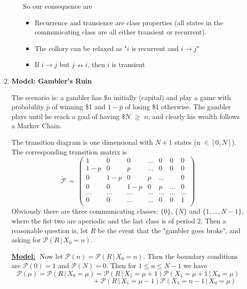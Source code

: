 \documentclass[10.5pt]{article}
\newcommand{\transmtx}[0]{\utilde{\mathcal{P}}}
\newcommand{\prob}[0]{\mathcal{P}}
\newcommand{\hilight}[1]{\colorbox{orange!20}{#1}}
\newenvironment{changemargin}[2]{%
  \begin{list}{}{%
    \setlength{\topsep}{0pt}%
    \setlength{\leftmargin}{#1}%
    \setlength{\rightmargin}{#2}%
    \setlength{\listparindent}{\parindent}%
    \setlength{\itemindent}{\parindent}%
    \setlength{\parsep}{\parskip}%
  }%
  \item[]}{\end{list}}
\begin{document}
\begin{changemargin}{-0.125in}{0in}
\begin{enumerate}
\begin{enumerate}
       So our consequence are 
       
       \begin{itemize}
       	\item Recurrence and transience are \hilight{class properties} (all states in the communicating class are all either transient or recurrent).
        
        \item The collory can be relaxed as "$i$ is recurrent and $i \rightarrow j$"
        \item If $i \rightarrow j$ but $j \nrightarrow i$, then $i$ is transient
        \end{itemize}
      \end{enumerate}
      
      
      \medskip
    
    \item \textbf{Model: Gambler's Ruin}
    
    \medskip
    
    The scenario is: a gambler has \$$n$ initially (capital) and play a game with probability $\bar{p}$ of winning \$1 and $1 - \bar{p}$ of losing \$1 otherwise. The gambler plays until he reach a goal of having \$$N$ $\geq$ $n$, and clearly his wealth follows a Markov Chain. 
    
    
    \medskip
    
    The transition diagram is one dimensional with $N + 1$ states (n $\in [0,N]$). The corresponding transition matrix is 
    \[
    \transmtx \, = \,
    \left(\begin{array}{ccccccc}
      1 & 0 &0 & ... & 0 & 0 & 0\\ 
      1-p & 0 & p & ... & 0 & 0 & 0\\
      0 & 1-p & 0 & p & ... & & 0\\
      0  & 0 &1-p & 0 & p & ... & 0\\  
      ... & ... &... &... &... &... & ...\\ 
      0 & 0 &... &... &0 &0 & 1\\    
      \end{array}\right)
    \]
    Obviously there are three communicating classes: $\{0\}$, $\{N\}$ and $\{1, ..., N-1\}$, where the fist two are aperiodic and the last class is of period 2. Then a reasonable question is, let $R$ be the event that the "gambler goes broke", and asking for $\prob(R \,|\, X_0 = n)$. 
    
    \medskip
    
    \underline{\textbf{Model:}}\,\, Now let $\prob(n) = \prob(R \,|\, X_0 = n)$. Then the boundary conditions are $\prob(0) = 1$ and $\prob(N) = 0$. Then for $1 \leq n \leq  N-1$ we have 
    \[
    \prob(\mu) = \prob(R \,|\, X_0 = \mu) = \prob(R\,|\,X_1 = \mu+1)\prob(X_1 = \mu+1\,|\,X_0 = \mu) 
    \]
    \[
    \,\,\,\,\,\,\,\,\,\,\,\,\,\,\,\, \,\,\,\,\,\,\,\,\,\,\,\,\,\,\,\, \,\,\,\,\,\,\,\,\,\,\,\,\,\,\,\, \,\,\,\,\,\,\,\,\,\,\,\,\,\,\,\,+ \prob(R\,|\,X_1 = \mu -1)\prob(X_1 = n-1\,|\,X_0 = \mu) 
    \]
     

\end{enumerate}
\end{changemargin}
\end{document}
